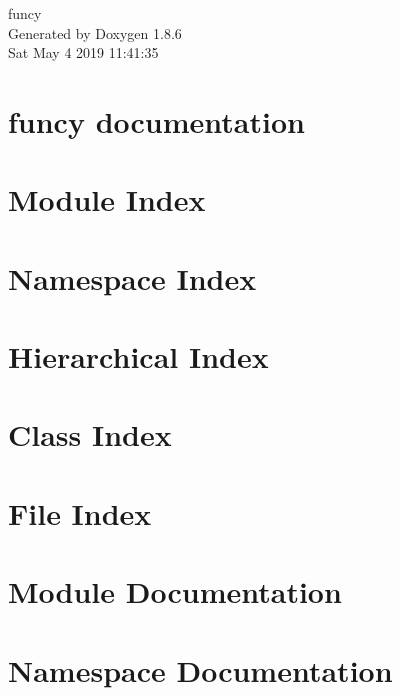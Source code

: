 \documentclass[twoside]{book}
\newcommand{\clearemptydoublepage}{%
  \newpage{\pagestyle{empty}\cleardoublepage}%
}
\begin{document}
\hypersetup{pageanchor=false}
\begin{titlepage}
\vspace*{7cm}
\begin{center}%
{\Large funcy }\\
\vspace*{1cm}
{\large Generated by Doxygen 1.8.6}\\
\vspace*{0.5cm}
{\small Sat May 4 2019 11:41:35}\\
\end{center}
\end{titlepage}
\clearemptydoublepage
\tableofcontents
\clearemptydoublepage
{}
\hypersetup{pageanchor=true}

\chapter{funcy documentation}
\label{index}\hypertarget{index}{}
\chapter{Module Index}

\chapter{Namespace Index}

\chapter{Hierarchical Index}

\chapter{Class Index}

\chapter{File Index}

\chapter{Module Documentation}










\chapter{Namespace Documentation}












\end{document}
